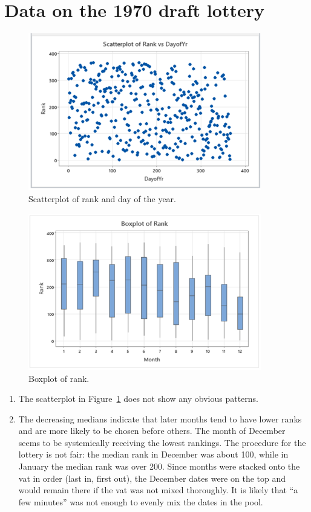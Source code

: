 \documentclass[12pt]{article}
\begin{document}
\section{Data on the 1970 draft lottery}
\begin{figure}
\begin{center}
\includegraphics[width=4in]{images/rank-day-scatterplot.png}
\end{center}
\caption{Scatterplot of rank and day of the year.\label{fig:rankdayscatterplot}}
\end{figure}
\begin{figure}
\begin{center}
\includegraphics[width=4in]{images/rank-boxplot.png}
\end{center}
\caption{Boxplot of rank.}
\end{figure}
\begin{enumerate}
    \item The scatterplot in Figure~\ref{fig:rankdayscatterplot} does not show any obvious patterns.
    \item The decreasing medians indicate that later months tend to have lower ranks and are more likely to be chosen before others. The month of December seems to be systemically receiving the lowest rankings. The procedure for the lottery is not fair: the median rank in December was about 100, while in January the median rank was over 200. Since months were stacked onto the vat in order (last in, first out), the December dates were on the top and would remain there if the vat was not mixed thoroughly. It is likely that “a few minutes” was not enough to evenly mix the dates in the pool. 
\end{enumerate}
\end{document}
